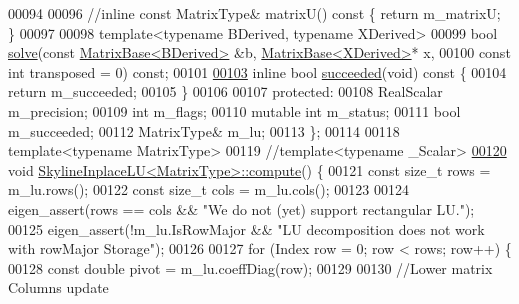 \begin{DoxyCode}
00094 
00096     \textcolor{comment}{//inline const MatrixType& matrixU() const \{ return m\_matrixU; \}}
00097 
00098     \textcolor{keyword}{template}<\textcolor{keyword}{typename} BDerived, \textcolor{keyword}{typename} XDerived>
00099     \textcolor{keywordtype}{bool} \hyperlink{class_eigen_1_1_skyline_inplace_l_u_a53c846d76559221d2bcf336a2da4d68f}{solve}(\textcolor{keyword}{const} \hyperlink{group___core___module_class_eigen_1_1_matrix_base}{MatrixBase<BDerived>} &b, 
      \hyperlink{group___core___module_class_eigen_1_1_matrix_base}{MatrixBase<XDerived>}* x,
00100             \textcolor{keyword}{const} \textcolor{keywordtype}{int} transposed = 0) \textcolor{keyword}{const};
00101 
\hyperlink{class_eigen_1_1_skyline_inplace_l_u_abd633c27a0a342fb392b6af3ceb800ba}{00103}     \textcolor{keyword}{inline} \textcolor{keywordtype}{bool} \hyperlink{class_eigen_1_1_skyline_inplace_l_u_abd633c27a0a342fb392b6af3ceb800ba}{succeeded}(\textcolor{keywordtype}{void})\textcolor{keyword}{ const }\{
00104         \textcolor{keywordflow}{return} m\_succeeded;
00105     \}
00106 
00107 \textcolor{keyword}{protected}:
00108     RealScalar m\_precision;
00109     \textcolor{keywordtype}{int} m\_flags;
00110     \textcolor{keyword}{mutable} \textcolor{keywordtype}{int} m\_status;
00111     \textcolor{keywordtype}{bool} m\_succeeded;
00112     MatrixType& m\_lu;
00113 \};
00114 
00118 \textcolor{keyword}{template}<\textcolor{keyword}{typename} MatrixType>
00119 \textcolor{comment}{//template<typename \_Scalar>}
\hyperlink{class_eigen_1_1_skyline_inplace_l_u_a590e9a988b2843712a29a541787e6c38}{00120} \textcolor{keywordtype}{void} \hyperlink{class_eigen_1_1_skyline_inplace_l_u_a590e9a988b2843712a29a541787e6c38}{SkylineInplaceLU<MatrixType>::compute}() \{
00121     \textcolor{keyword}{const} \textcolor{keywordtype}{size\_t} rows = m\_lu.rows();
00122     \textcolor{keyword}{const} \textcolor{keywordtype}{size\_t} cols = m\_lu.cols();
00123 
00124     eigen\_assert(rows == cols && \textcolor{stringliteral}{"We do not (yet) support rectangular LU."});
00125     eigen\_assert(!m\_lu.IsRowMajor && \textcolor{stringliteral}{"LU decomposition does not work with rowMajor Storage"});
00126 
00127     \textcolor{keywordflow}{for} (Index row = 0; row < rows; row++) \{
00128         \textcolor{keyword}{const} \textcolor{keywordtype}{double} pivot = m\_lu.coeffDiag(row);
00129 
00130         \textcolor{comment}{//Lower matrix Columns update}

\end{DoxyCode}
